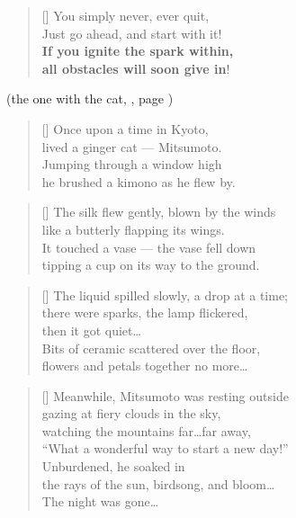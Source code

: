 \begin{verse}[\versewidth]
	You simply never, ever quit, \\
	Just go ahead, and start with it! \\
	\textbf{If you ignite the spark within, \\
	all obstacles will soon give in}!
\end{verse}
	

\clearpage
\PlainPoemTitle
{}
\vspace{-5mm}
\begin{center}
	(the one with the cat, , page \pageref{poem:mitsumoto.ru})
\end{center}

\begin{multicols}{2}
	\begin{verse}[\versewidth]
		Once upon a time in Kyoto,\\
		lived a ginger cat --- Mitsumoto.\\
		Jumping through a window high\\
		he brushed a kimono as he flew by.
	\end{verse}
	
	\begin{verse}[\versewidth]
		The silk flew gently, blown by the winds\\
		like a butterly flapping its wings.\\
		It touched a vase --- the vase fell down\\
		tipping a cup on its way to the ground.
	\end{verse}
	
	\begin{verse}[\versewidth]
		The liquid spilled slowly, a drop at a time;\\
		there were sparks, the lamp flickered,\\
		then it got quiet\ldots\\
		Bits of ceramic scattered over the floor,\\
		flowers and petals together no more\ldots
	\end{verse}
	
	
	\begin{verse}[\versewidth]
		Meanwhile, Mitsumoto was resting outside\\
		gazing at fiery clouds in the sky,\\
		watching the mountains far\ldots far away,\\
		``What a wonderful way to start a new day!''\\
		Unburdened, he soaked in\\
		the rays of the sun, birdsong, and bloom\ldots\\
		The night was gone\ldots
	\end{verse}
	


\end{multicols}
